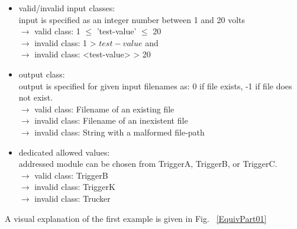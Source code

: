 	\begin{itemize}
		\item valid/invalid input classes: \\
			input is specified as an integer number between 1 and 20 volts \\
			$\rightarrow$ valid class: 1 $\le$ 'test-value' $\le$ 20 \\
			$\rightarrow$ invalid class: 1 > $test-value$ and \\
			$\rightarrow$ invalid class: <test-value> > 20 \\
		\item output class: \\
			output is specified for given input filenames as: 0 if file exists, -1 if file does not exist. \\
			$\rightarrow$ valid class: Filename of an existing file\\
			$\rightarrow$ invalid class:  Filename of an inexistent file\\
			$\rightarrow$ invalid class:  String with a malformed file-path \\
		\item dedicated allowed values: \\
			addressed module can be chosen from TriggerA, TriggerB, or TriggerC. \\
			$\rightarrow$ valid class: TriggerB \\
			$\rightarrow$ invalid class:  TriggerK \\
			$\rightarrow$ invalid class:  Trucker \\
	\end{itemize}

	A visual explanation of the first example is given in Fig. ~\ref{EquivPart01} 
	
